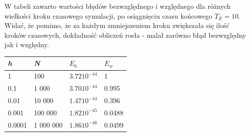 \documentclass[a4paper,12pt,polish]{sphinxmanual}
\begin{document}
W tabeli zawarto wartości błędów bezwzględnego i względnego dla różnych wielkości kroku czasowego
symulacji, po osiągnięciu czasu końcowego $T_E = 10$. Widać, że pomimo, że za każdym zmniejszeniem
kroku zwiększała się ilość kroków czasowych, dokładność obliczeń rosła - malał zarówno błąd bezwzględny
jak i względny.

\begin{tabulary}{\linewidth}{|L|L|L|L|}
\hline

\emph{h}
 & 
\emph{N}
 & 
$E_b$
 & 
$E_w$
\\\hline

1
 & 
100
 & 
$3.72 10^{-44}$
 & 
1
\\\hline

0.1
 & 
1 000
 & 
$3.70 10^{-44}$
 & 
0.995
\\\hline

0.01
 & 
10 000
 & 
$1.47 10^{-44}$
 & 
0.396
\\\hline

0.001
 & 
100 000
 & 
$1.82 10^{-45}$
 & 
0.0488
\\\hline

0.0001
 & 
1 000 000
 & 
$1.86 10^{-46}$
 & 
0.0499
\\\hline
\end{tabulary}
\end{document}
